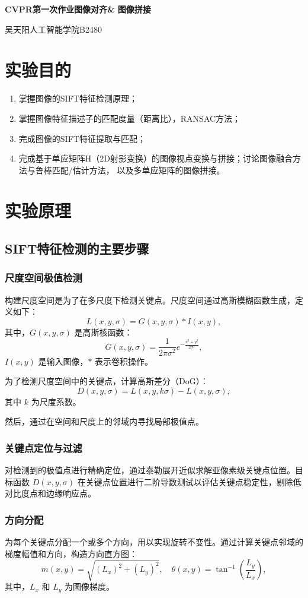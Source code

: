 \documentclass[12pt, a4paper, oneside]{ctexart}
\numberwithin{equation}{section}  %
\newenvironment{myTitle}[1]{
    \begin{center}
    {\zihao{-2}\bf #1\\}
    \zihao{-4}\it
}{\end{center}}  %
\begin{document}
\clearpage
\begin{myTitle}{CVPR第一次作业\quad 图像对齐\& 图像拼接}
    吴天阳\quad 人工智能学院B2480
\end{myTitle}
\section{实验目的}
\begin{enumerate}
    \item 掌握图像的SIFT特征检测原理；
    \item 掌握图像特征描述子的匹配度量（距离比），RANSAC方法；
    \item 完成图像的SIFT特征提取与匹配；
    \item 完成基于单应矩阵H（2D射影变换）的图像视点变换与拼接；讨论图像融合方法与鲁棒匹配/估计方法，
          以及多单应矩阵的图像拼接。
\end{enumerate}
\section{实验原理}
\subsection{SIFT特征检测的主要步骤}
\subsubsection{尺度空间极值检测}
构建尺度空间是为了在多尺度下检测关键点。尺度空间通过高斯模糊函数生成，定义如下：
\[
L(x, y, \sigma) = G(x, y, \sigma) * I(x, y),
\]
其中，\( G(x, y, \sigma) \) 是高斯核函数：
\[
G(x, y, \sigma) = \frac{1}{2\pi\sigma^2} e^{-\frac{x^2 + y^2}{2\sigma^2}},
\]
\( I(x, y) \) 是输入图像，\( * \) 表示卷积操作。

为了检测尺度空间中的关键点，计算高斯差分（DoG）：
\[
D(x, y, \sigma) = L(x, y, k\sigma) - L(x, y, \sigma),
\]
其中 \( k \) 为尺度系数。

然后，通过在空间和尺度上的邻域内寻找局部极值点。

\subsubsection{关键点定位与过滤}
对检测到的极值点进行精确定位，通过泰勒展开近似求解亚像素级关键点位置。目标函数 \( D(x, y, \sigma) \) 
在关键点位置进行二阶导数测试以评估关键点稳定性，剔除低对比度点和边缘响应点。

\subsubsection{方向分配}
为每个关键点分配一个或多个方向，用以实现旋转不变性。通过计算关键点邻域的梯度幅值和方向，构造方向直方图：
\[
m(x, y) = \sqrt{(L_x)^2 + (L_y)^2}, \quad \theta(x, y) = \tan^{-1}\left(\frac{L_y}{L_x}\right),
\]
其中，\( L_x \) 和 \( L_y \) 为图像梯度。
\end{document}
